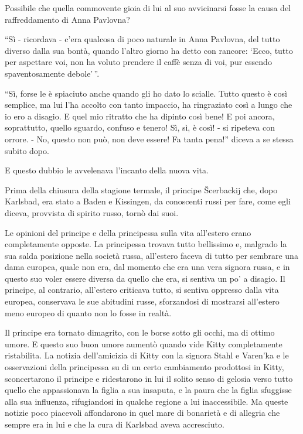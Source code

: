 Possibile che quella commovente gioia di lui al suo avvicinarsi fosse la causa del raffreddamento di Anna Pavlovna? 

``Sì - ricordava - c'era qualcosa di poco naturale in Anna Pavlovna, del tutto diverso dalla sua bontà, quando l'altro giorno ha detto con rancore: `Ecco, tutto per aspettare voi, non ha voluto prendere il caffè senza di voi, pur essendo spaventosamente debole'\,''. 

``Sì, forse le è spiaciuto anche quando gli ho dato lo scialle. Tutto questo è così semplice, ma lui l'ha accolto con tanto impaccio, ha ringraziato così a lungo che io ero a disagio. E quel mio ritratto che ha dipinto così bene! E poi ancora, soprattutto, quello sguardo, confuso e tenero! Sì, sì, è così! - si ripeteva con orrore. - No, questo non può, non deve essere! Fa tanta pena!'' diceva a se stessa subito dopo. 

E questo dubbio le avvelenava l'incanto della nuova vita. 

Prima della chiusura della stagione termale, il principe Šcerbackij che, dopo Karlsbad, era stato a Baden e Kissingen, da conoscenti russi per fare, come egli diceva, provvista di spirito russo, tornò dai suoi. 

Le opinioni del principe e della principessa sulla vita all'estero erano completamente opposte. La principessa trovava tutto bellissimo e, malgrado la sua salda posizione nella società russa, all'estero faceva di tutto per sembrare una dama europea, quale non era, dal momento che era una vera signora russa, e in questo suo voler essere diversa da quello che era, si sentiva un po' a disagio. Il principe, al contrario, all'estero criticava tutto, si sentiva oppresso dalla vita europea, conservava le sue abitudini russe, sforzandosi di mostrarsi all'estero meno europeo di quanto non lo fosse in realtà. 

Il principe era tornato dimagrito, con le borse sotto gli occhi, ma di ottimo umore. E questo suo buon umore aumentò quando vide Kitty completamente ristabilita. La notizia dell'amicizia di Kitty con la signora Stahl e Varen'ka e le osservazioni della principessa su di un certo cambiamento prodottosi in Kitty, sconcertarono il principe e ridestarono in lui il solito senso di gelosia verso tutto quello che appassionava la figlia a sua insaputa, e la paura che la figlia sfuggisse alla sua influenza, rifugiandosi in qualche regione a lui inaccessibile. Ma queste notizie poco piacevoli affondarono in quel mare di bonarietà e di allegria che sempre era in lui e che la cura di Karlsbad aveva accresciuto. 


